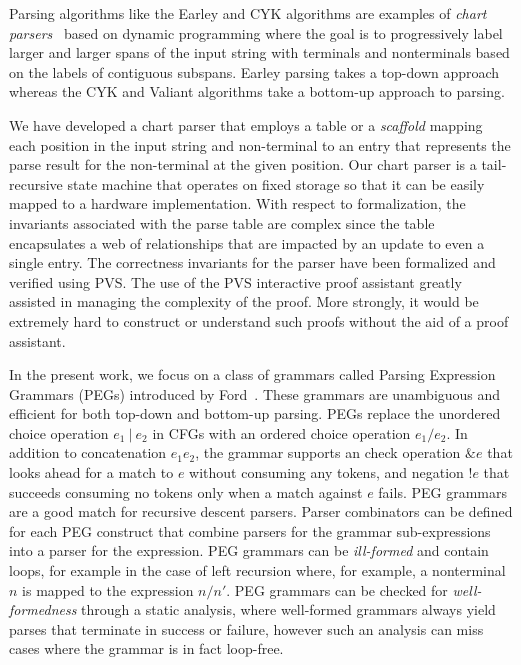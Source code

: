 Parsing algorithms like the Earley and CYK algorithms are examples of \emph{chart
parsers}~\cite{earley1970efficient,kay1986algorithm,pereira1983parsing} based on dynamic programming where the goal is to
progressively label larger and larger spans of the input string with
terminals and nonterminals based on the labels of contiguous subspans.
Earley parsing takes a top-down approach whereas the CYK and Valiant
algorithms take a bottom-up approach to parsing.

We have developed a chart parser that employs a table or a \emph{scaffold} mapping each
position in the input string and non-terminal to an entry that
represents the parse result for the non-terminal at the given
position.  Our chart parser is a tail-recursive state machine that
operates on fixed storage so that it can be easily mapped to a
hardware implementation. With respect to formalization, the invariants
associated with the parse table are complex since the table
encapsulates a web of relationships that are impacted by an update to
even a single entry.  The correctness invariants for the parser have been
formalized and verified using PVS.  
The use of the PVS interactive proof assistant
greatly assisted in managing the complexity of the proof.  More strongly, it 
would be extremely hard to construct or understand such proofs
without the aid of a proof assistant. 


In the present work, we focus on a class of grammars called Parsing
Expression Grammars (PEGs) introduced by Ford~\cite{DBLP:conf/popl/Ford04}.  These grammars are
unambiguous and efficient for both top-down and bottom-up parsing.
PEGs replace the unordered choice operation $e_1 ~|~ e_2$ in CFGs with
an ordered choice operation $e_1/e_2$\@.  In addition to concatenation
$e_1 e_2$, the grammar supports an check operation $\& e$ that looks
ahead for a match to $e$ without consuming any tokens, and negation
$!e$ that succeeds consuming no tokens only when a match against $e$
fails.   PEG grammars are a good match for  recursive descent
parsers.  Parser combinators can be defined for each PEG construct that
combine parsers for the grammar sub-expressions into a parser for the
expression.  PEG grammars can be \emph{ill-formed} and contain loops, for
example in the case of left recursion where, for example, a
nonterminal $n$ is mapped to the expression $n/n'$\@.  PEG grammars can
be checked for \emph{well-formedness} through a static analysis, where
well-formed grammars always yield parses that terminate in success or
failure, however such an analysis can miss cases where the grammar
is in fact loop-free.  

